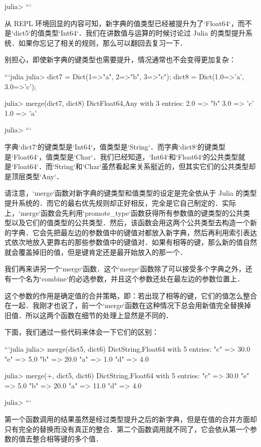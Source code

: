 julia> 
```

从 REPL 环境回显的内容可知，新字典的值类型已经被提升为了`Float64`，而不是`dict5`的值类型`Int64`．我们在讲数值与运算的时候讨论过 Julia 的类型提升系统．如果你忘记了相关的规则，那么可以翻回去复习一下．

别担心，即使新字典的键类型也需要提升，情况通常也不会变得更加复杂：

```julia
julia> dict7 = Dict(1=>"a", 2=>"b", 3=>"c"); dict8 = Dict(1.0=>'a', 3.0=>'c');

julia> merge(dict7, dict8)
Dict{Float64,Any} with 3 entries:
  2.0 => "b"
  3.0 => 'c'
  1.0 => 'a'

julia> 
```

字典`dict7`的键类型是`Int64`，值类型是`String`．而字典`dict8`的键类型是`Float64`，值类型是`Char`．我们已经知道，`Int64`和`Float64`的公共类型就是`Float64`．而`String`和`Char`虽然看起来关系挺近的，但其实它们的公共类型却是顶层类型`Any`．

请注意，`merge`函数对新字典的键类型和值类型的设定是完全依从于 Julia 的类型提升系统的．而它的最右优先规则却正好相反，完全是它自己制定的．实际上，`merge`函数会先利用`promote_type`函数获得所有参数值的键类型的公共类型以及它们的值类型的公共类型．然后，该函数会用这两个公共类型去构造一个新的字典．它会先把最左边的参数值中的键值对都放入新字典，然后再利用索引表达式依次地放入更靠右的那些参数值中的键值对．如果有相等的键，那么新的值自然就会覆盖掉旧的值，但是键肯定还是最开始放入的那一个．

我们再来讲另一个`merge`函数．这个`merge`函数除了可以接受多个字典之外，还有一个名为`combine`的必选参数，并且这个参数还处在最左边的参数位置上．

这个参数的作用是确定值的合并策略，即：若出现了相等的键，它们的值怎么整合在一起．我刚才也说了，前一个`merge`函数在这种情况下总会用新值完全替换掉旧值．所以这两个函数在细节的处理上显然是不同的．

下面，我们通过一些代码来体会一下它们的区别：

```julia
julia> merge(dict5, dict6)
Dict{String,Float64} with 5 entries:
  "c" => 30.0
  "e" => 5.0
  "b" => 20.0
  "a" => 1.0
  "d" => 4.0

julia> merge(+, dict5, dict6)
Dict{String,Float64} with 5 entries:
  "c" => 30.0
  "e" => 5.0
  "b" => 20.0
  "a" => 11.0
  "d" => 4.0

julia> 
```

第一个函数调用的结果虽然是经过类型提升之后的新字典，但是在值的合并方面却只有完全的替换而没有真正的整合．第二个函数调用就不同了，它会依从第一个参数的值去整合相等键的多个值．

